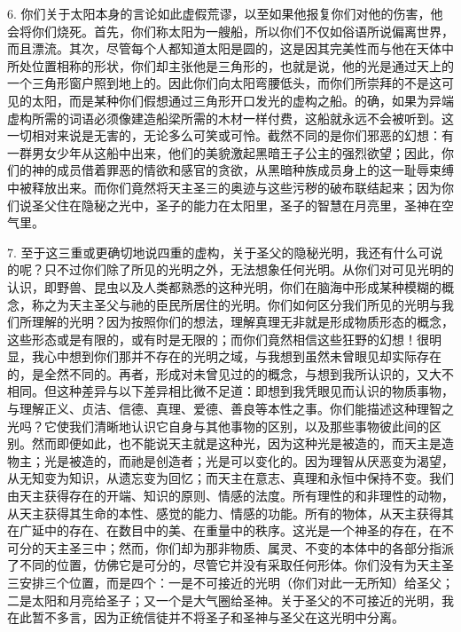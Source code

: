 6. 你们关于太阳本身的言论如此虚假荒谬，以至如果他报复你们对他的伤害，他会将你们烧死。首先，你们称太阳为一艘船，所以你们不仅如俗语所说偏离世界，而且漂流。其次，尽管每个人都知道太阳是圆的，这是因其完美性而与他在天体中所处位置相称的形状，你们却主张他是三角形的，也就是说，他的光是通过天上的一个三角形窗户照到地上的。因此你们向太阳弯腰低头，而你们所崇拜的不是这可见的太阳，而是某种你们假想通过三角形开口发光的虚构之船。的确，如果为异端虚构所需的词语必须像建造船梁所需的木材一样付费，这船就永远不会被听到。这一切相对来说是无害的，无论多么可笑或可怜。截然不同的是你们邪恶的幻想：有一群男女少年从这船中出来，他们的美貌激起黑暗王子公主的强烈欲望；因此，你们的神的成员借着罪恶的情欲和感官的贪欲，从黑暗种族成员身上的这一耻辱束缚中被释放出来。而你们竟然将天主圣三的奥迹与这些污秽的破布联结起来；因为你们说圣父住在隐秘之光中，圣子的能力在太阳里，圣子的智慧在月亮里，圣神在空气里。\par

7. 至于这三重或更确切地说四重的虚构，关于圣父的隐秘光明，我还有什么可说的呢？只不过你们除了所见的光明之外，无法想象任何光明。从你们对可见光明的认识，即野兽、昆虫以及人类都熟悉的这种光明，你们在脑海中形成某种模糊的概念，称之为天主圣父与祂的臣民所居住的光明。你们如何区分我们所见的光明与我们所理解的光明？因为按照你们的想法，理解真理无非就是形成物质形态的概念，这些形态或是有限的，或有时是无限的；而你们竟然相信这些狂野的幻想！很明显，我心中想到你们那并不存在的光明之域，与我想到虽然未曾眼见却实际存在的，是全然不同的。再者，形成对未曾见过的的概念，与想到我所认识的，又大不相同。但这种差异与以下差异相比微不足道：即想到我凭眼见而认识的物质事物，与理解正义、贞洁、信德、真理、爱德、善良等本性之事。你们能描述这种理智之光吗？它使我们清晰地认识它自身与其他事物的区别，以及那些事物彼此间的区别。然而即便如此，也不能说天主就是这种光，因为这种光是被造的，而天主是造物主；光是被造的，而祂是创造者；光是可以变化的。因为理智从厌恶变为渴望，从无知变为知识，从遗忘变为回忆；而天主在意志、真理和永恒中保持不变。我们由天主获得存在的开端、知识的原则、情感的法度。所有理性的和非理性的动物，从天主获得其生命的本性、感觉的能力、情感的功能。所有的物体，从天主获得其在广延中的存在、在数目中的美、在重量中的秩序。这光是一个神圣的存在，在不可分的天主圣三中；然而，你们却为那非物质、属灵、不变的本体中的各部分指派了不同的位置，仿佛它是可分的，尽管它并没有采取任何形体。你们没有为天主圣三安排三个位置，而是四个：一是不可接近的光明（你们对此一无所知）给圣父；二是太阳和月亮给圣子；又一个是大气圈给圣神。关于圣父的不可接近的光明，我在此暂不多言，因为正统信徒并不将圣子和圣神与圣父在这光明中分离。\par

